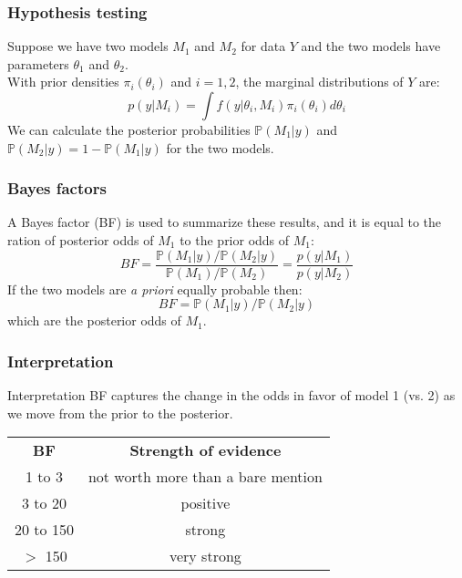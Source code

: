 \documentclass{beamer}
\renewcommand{\P}{\mathbb{P}}
\newcommand{\1}{\ensuremath{\mathbf{1}}}
\begin{document}
%
%
%
\begin{frame}\frametitle{Hypothesis testing}
	Suppose we have two models $M_1$ and $M_2$ for data $Y$ and the two models have parameters $\theta_1$ and $\theta_2$.\\[1ex]
	With prior densities $\pi_i (\theta_i )$ and $i = 1, 2$, the marginal distributions of $Y$ are:
	\begin{equation}
		p(y|M_i) = \int f(y|\theta_i,M_i) \pi_i (\theta_i ) d\theta_i
	\end{equation}
	We can calculate the posterior probabilities $\P(M_1|y)$ and $\P(M_2|y) = 1 - \P(M_1|y)$ for the two models.
\end{frame}
%
%
%
\begin{frame}\frametitle{Bayes factors}
	A Bayes factor (BF) is used to summarize these results, and it is equal to the ration of posterior odds of $M_1$ to the prior odds of $M_1$:
	\begin{equation}
		BF = \frac{\P(M_1|y)/\P(M_2|y)}{\P(M_1)/\P(M_2)} = \frac{p(y|M_1)}{p(y|M_2)}
	\end{equation}
	If the two models are \emph{a priori} equally probable then:
	\begin{equation}
		BF = \P(M_1|y)/\P(M_2|y)
	\end{equation}
	which are the posterior odds of $M_1$.
\end{frame}
%
%
%
\begin{frame}\frametitle{Interpretation}
	\begin{block}{Interpretation}
		BF captures the change in the odds in favor of model 1 (vs. 2) as we move from the prior to the posterior.
	\end{block}
	\begin{center}
	\begin{tabular}{c|c}
		\textbf{BF}		& \textbf{Strength of evidence}\\
		1 to 3			& not worth more than a bare mention\\
		3 to 20			& positive\\
		20 to 150		& strong\\
		$>$ 150			& very strong\\
	\end{tabular}
	\end{center}
\end{frame}
\end{document}

